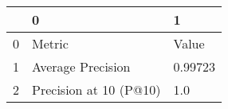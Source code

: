 \begin{tabular}{lll}
\toprule
{} &                       0 &        1 \\
\midrule
0 &                  Metric &    Value \\
1 &       Average Precision &  0.99723 \\
2 &  Precision at 10 (P@10) &      1.0 \\
\bottomrule
\end{tabular}

